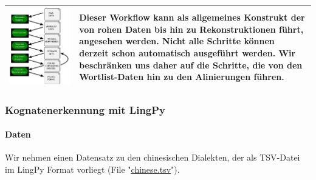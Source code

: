 \begin{longtable}[c]{@{}ll@{}}
\toprule
\includegraphics{img/workflow_basic.pdf}
& Dieser Workflow kann als allgemeines Konstrukt der von rohen Daten bis
hin zu Rekonstruktionen führt, angesehen werden. Nicht alle Schritte
können derzeit schon automatisch ausgeführt werden. Wir beschränken uns
daher auf die Schritte, die von den Wortlist-Daten hin zu den
Alinierungen führen.\tabularnewline
\bottomrule
\end{longtable}



\subsubsection{Kognatenerkennung mit LingPy}

\paragraph{Daten}

Wir nehmen einen Datensatz zu den chinesischen Dialekten, der als
TSV-Datei im LingPy Format vorliegt (File
"\href{https://github.com/LinguList/pyjs-seminar/blob/master/website/code/data/chinese.tsv}{chinese.tsv}").

